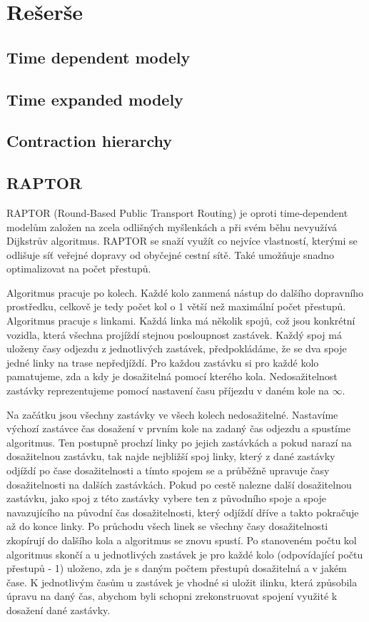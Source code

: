 \chapter{Rešerše}

\section{Time dependent modely}
\section{Time expanded modely}
\section{Contraction hierarchy}
\section{RAPTOR}
RAPTOR (Round-Based Public Transport Routing) \citep*{RAPTOR} je oproti
time-dependent modelům založen na zcela odlišných myšlenkách a při svém běhu
nevyužívá Dijkstrův algoritmus. RAPTOR se snaží využít co nejvíce vlastností,
kterými se odlišuje síť veřejné dopravy od obyčejné cestní sítě. Také umožňuje
snadno optimalizovat na počet přestupů.

Algoritmus pracuje po kolech. Každé kolo zanmená nástup do dalšího dopravního
prostředku, celkově je tedy počet kol o 1 větší než maximální počet přestupů.
Algoritmus pracuje s linkami. Každá linka má několik spojů, což jsou konkrétní
vozidla, která všechna projíždí stejnou posloupnost zastávek. Každý spoj má
uloženy časy odjezdu z jednotlivých zastávek, předpokládáme, že se dva spoje
jedné linky na trase nepředjíždí. Pro každou zastávku si pro každé kolo
pamatujeme, zda a kdy je dosažitelná pomocí kterého kola. Nedosažitelnost
zastávky reprezentujeme pomocí nastavení času příjezdu v daném kole na $\infty$.

Na začátku jsou všechny zastávky ve všech kolech nedosažitelné. Nastavíme
výchozí zastávce čas dosažení v prvním kole na zadaný čas odjezdu a spustíme
algoritmus. Ten postupně prochzí linky po jejich zastávkách a pokud narazí na
dosažitelnou zastávku, tak najde nejbližší spoj linky, který z dané zastávky
odjíždí po čase dosažitelnosti a tímto spojem se  a průběžně upravuje
časy dosažitelnosti na dalších zastávkách. Pokud po cestě nalezne další
dosažitelnou zastávku, jako spoj z této zastávky vybere ten z původního spoje a
spoje navazujícího na původní čas dosažitelnosti, který odjíždí dříve a takto
pokračuje až do konce linky. Po průchodu všech linek se všechny časy
dosažitelnosti zkopírují do dalšího kola a algoritmus se znovu spustí. Po
stanoveném počtu kol algoritmus skončí a u jednotlivých zastávek je pro každé
kolo (odpovídající počtu přestupů - 1) uloženo, zda je s daným počtem přestupů
dosažitelná a v jakém čase. K jednotlivým časům u zastávek je vhodné si uložit
ilinku, která způsobila úpravu na daný čas, abychom byli schopni zrekonstruovat
spojení využité k dosažení dané zastávky. 

